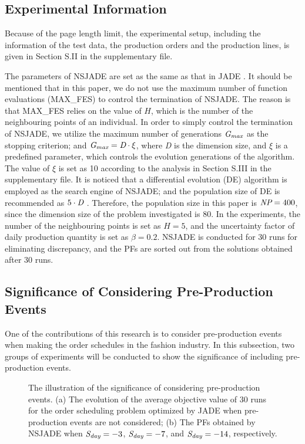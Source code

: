 \documentclass[journal]{IEEEtran}
\theoremstyle{definition}
\begin{document}
\subsection{Experimental Information}
Because of the page length limit, the experimental setup, including the information of the test data, the production orders and the production lines, is given in Section S.II in the supplementary file.

The parameters of NSJADE are set as the same as that in JADE \cite{zhang2009jade}. It should be mentioned that in this paper, we do not use the maximum number of function evaluations (MAX\_FES) to control the termination of NSJADE. The reason is that MAX\_FES relies on the value of $H$, which is the number of the neighbouring points of an individual. In order to simply control the termination of NSJADE, we utilize the maximum number of generations $\emph{G}_{\emph{max}}$ as the stopping criterion; and $\emph{G}_{\emph{max}}=\emph{D}\cdot\xi$, where \emph{D} is the dimension size, and $\xi$ is a predefined parameter, which controls the evolution generations of the algorithm. The value of $\xi$ is set as 10 according to the analysis in Section S.III in the supplementary file. It is noticed that a differential evolution (DE) algorithm is employed as the search engine of NSJADE; and the population size of DE is recommended as $5\cdot\emph{D}$ \cite{das2011differential}. Therefore, the population size in this paper is $\emph{NP}=400$, since the dimension size of the problem investigated is 80. In the experiments, the number of the neighbouring points is set as $H=5$, and the uncertainty factor of daily production quantity is set as $\beta=0.2$. NSJADE is conducted for 30 runs for eliminating discrepancy, and the PFs are sorted out from the solutions obtained after 30 runs.

\subsection{Significance of Considering Pre-Production Events}\label{secc}
One of the contributions of this research is to consider pre-production events when making the order schedules in the fashion industry. In this subsection, two groups of experiments will be conducted to show the significance of including pre-production events.
\begin{figure}
\centering
{}
\caption{The illustration of the significance of considering pre-production events. (a) The evolution of the average objective value of 30 runs for the order scheduling problem optimized by JADE when pre-production events are not considered; (b) The PFs obtained by NSJADE when $\emph{S}_\emph{day}=-3$, $\emph{S}_\emph{day}=-7$, and $\emph{S}_\emph{day}=-14$, respectively.} \label{pretwo}
\end{figure}
\end{document}
